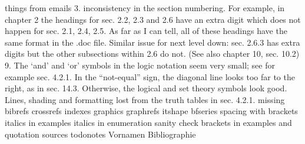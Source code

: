 things from emails
  3. inconsistency in the section numbering. For example, in chapter 2 the headings for sec. 2.2, 2.3 and 2.6 have an extra digit which does not happen for sec. 2.1, 2.4, 2.5.  As far as I can tell, all of these headings have the same format in the .doc file. Similar issue for next level down: sec. 2.6.3 has extra digits but the other subsections within 2.6 do not.  (See also chapter 10, sec. 10.2)
  9. The ‘and’ and ‘or’ symbols in the logic notation seem very small; see for example sec. 4.2.1. In the “not-equal” sign, the diagonal line looks too far to the right, as in sec. 14.3.  Otherwise, the logical and set theory symbols look good.
  Lines, shading and formatting lost from the truth tables in sec. 4.2.1.
missing bibrefs
crossrefs 
indexes
graphics 
graphrefs 
itshape
bfseries 
spacing with brackets
italics in examples
italics in enumeration 
sanity check 
brackets in examples and quotation sources    
todonotes
Vornamen Bibliographie
